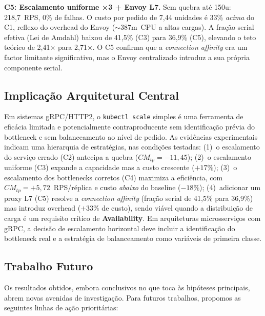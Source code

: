 \documentclass[manuscript,oneside]{acmart}
\begin{document}
\textbf{C5: Escalamento uniforme ×3 + Envoy L7.} Sem quebra até 150u: 218,7~RPS, 0\% de falhas. O custo por pedido de 7,44 unidades é 33\% \emph{acima} do C1, reflexo do overhead do Envoy ($\sim$387m~CPU a altas cargas). A fração serial efetiva (Lei de Amdahl) baixou de 41,5\% (C3) para 36,9\% (C5), elevando o teto teórico de 2,41$\times$ para 2,71$\times$. O C5 confirma que a \textit{connection affinity} era um factor limitante significativo, mas o Envoy centralizado introduz a sua própria componente serial.

\subsection{Implicação Arquitetural Central}

Em sistemas gRPC/HTTP2, o \texttt{kubectl scale} simples é uma ferramenta de eficácia limitada e potencialmente contraproducente sem identificação prévia do bottleneck e sem balanceamento ao nível de pedido. As evidências experimentais indicam uma hierarquia de estratégias, nas condições testadas: (1)~o escalamento do serviço errado (C2) antecipa a quebra ($CM_{tp}=-11{,}45$); (2)~o escalamento uniforme (C3) expande a capacidade mas a custo crescente ($+17\%$); (3)~o escalamento dos bottlenecks corretos (C4) maximiza a eficiência, com $CM_{tp}=+5{,}72$~RPS/réplica e custo \emph{abaixo} do baseline ($-18\%$); (4)~adicionar um proxy L7 (C5) resolve a \textit{connection affinity} (fração serial de 41,5\% para 36,9\%) mas introduz overhead ($+33\%$ de custo), sendo viável quando a distribuição de carga é um requisito crítico de \textbf{Availability}. Em arquiteturas microsserviços com gRPC, a decisão de escalamento horizontal deve incluir a identificação do bottleneck real e a estratégia de balanceamento como variáveis de primeira classe.

\subsection{Trabalho Futuro}

Os resultados obtidos, embora conclusivos no que toca às hipóteses principais, abrem novas avenidas de investigação. Para futuros trabalhos, propomos as seguintes linhas de ação prioritárias:
\end{document}
